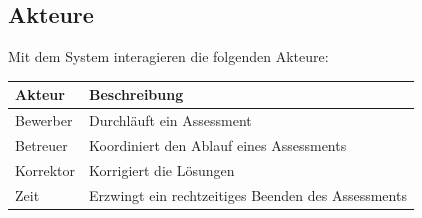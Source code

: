 \subsection{Akteure}

Mit dem System interagieren die folgenden Akteure:

\begin{tabular}{|l|l|}
    \hline
    \rowcolor{PrimaryColor!50} Akteur & Beschreibung                                       \\
    \hline
    Bewerber                          & Durchläuft ein Assessment                          \\
    \hline
    Betreuer                          & Koordiniert den Ablauf eines Assessments           \\
    \hline
    Korrektor                         & Korrigiert die Lösungen                            \\
    \hline
    Zeit                              & Erzwingt ein rechtzeitiges Beenden des Assessments \\
    \hline
\end{tabular}
